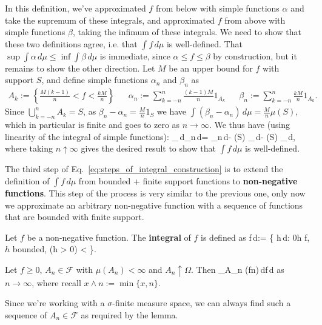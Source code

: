In this definition, we've approximated $f$ from below with simple functions $\alpha$ and take the supremum of these integrals, and approximated $f$ from above with simple functions $\beta$, taking the infimum of these integrals. We need to show that these two definitions agree, i.e. that $\int f\,d\mu$ is well-defined. That $\sup \int \alpha\,d\mu \leq \inf \int \beta\,d\mu$ is immediate, since $\alpha\leq f\leq \beta$ by construction, but it remains to show the other direction. Let $M$ be an upper bound for $f$ with support $S$, and define simple functions $\alpha_n$ and $\beta_n$ as
\begin{align}
	A_k := \left\{\frac{M(k - 1)}{n} < f < \frac{kM}{n} \right\} && \alpha_n := \sum_{k =-n}^n \frac{(k - 1)M}{n} 1_{A_k} && \beta_n := \sum_{k =-n}^n \frac{kM}{n} 1_{A_k}.
\end{align}
Since $\bigcup_{k = -n}^n A_k= S$, as $\beta_n - \alpha_n = \frac{M}{n} 1_{S}$ we have $\int (\beta_n - \alpha_n)\,d\mu = \frac{M}{n} \mu(S)$, which in particular is finite and goes to zero as $n\rightarrow\infty$. We thus have (using linearity of the integral of simple functions):
\eq
	\sup_\alpha\int\alpha\,d\mu\geq \int\alpha_n\,d\mu = \int\beta_n\,d\mu - \mu(S) \geq \inf_\beta\int\beta\,d\mu - \mu(S) \uparrow \inf_\beta\int\beta\,d\mu,
\qe
where taking $n\uparrow\infty$ gives the desired result to show that $\int f\,d\mu$ is well-defined. 

The third step of Eq.~\eqref{eq:steps_of_integral_construction} is to extend the definition of $\int f\,d\mu$ from bounded + finite support functions to \textbf{non-negative functions}. This step of the process is very similar to the previous one, only now we approximate an arbitrary non-negative function with a sequence of functions that are bounded with finite support. 
\begin{definition}
	Let $f$ be a non-negative function. The \textbf{integral} of $f$ is defined as
	\eq
		\int f\,d\mu := \sup\left\{ \int h\,d\mu : 0\leq h \leq f, \textnormal{ $h$ bounded, } \mu(h > 0) < \infty \right\}.
	\qe
\end{definition}

\begin{lemma}
	Let $f\geq 0$, $A_n\in\mathcal F$ with $\mu(A_n) < \infty$ and $A_n\uparrow\Omega$. Then
	\eq
		\int_{A_n} (f\wedge n)\,d\mu \uparrow \int f\,d\mu
	\qe
	as $n\rightarrow\infty$, where recall $x\wedge n := \min\{x, n\}$. 
\end{lemma}
Since we're working with a $\sigma$-finite measure space, we can always find such a sequence of $A_n\in\mathcal F$ as required by the lemma. 

